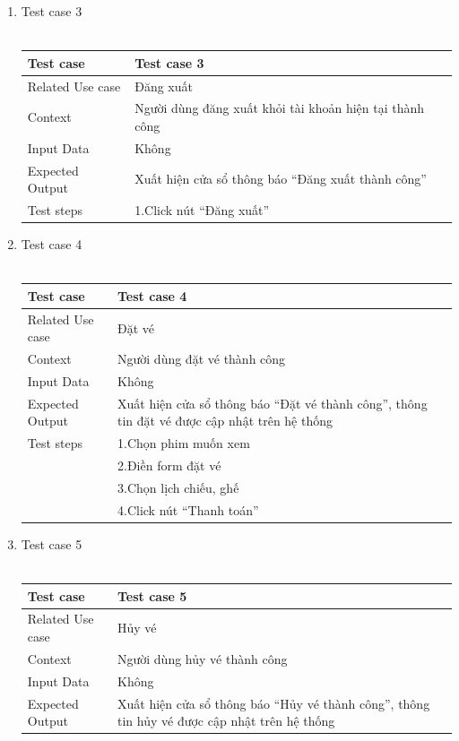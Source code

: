 \documentclass[a4paper, 12pt]{article}
\begin{document}
\begin{enumerate}
		\item Test case 3\\\\
		\begin{tabular}{|l|l|}
			\hline
			Test case&
			Test case 3\\
			\hline
			Related Use case&
			Đăng xuất\\
			\hline
			Context&
			Người dùng đăng xuất khỏi tài khoản hiện tại thành công\\
			\hline
			Input Data&
			Không\\
			\hline
			Expected Output&
			Xuất hiện cửa sổ thông báo “Đăng xuất thành công” \\
			\hline
			Test steps&
			1.Click nút “Đăng xuất”\\
			\hline
		\end{tabular}
		\item Test case 4\\\\
		\begin{tabular}{|l|l|}
			\hline
			Test case&
			Test case 4\\
			\hline
			Related Use case&
			Đặt vé\\
			\hline
			Context&
			Người dùng đặt vé thành công\\
			\hline
			Input Data&
			Không\\
			\hline
			Expected Output&
			Xuất hiện cửa sổ thông báo “Đặt vé thành công”, thông tin đặt vé được cập nhật trên hệ thống\\
			\hline
			Test steps&
			1.Chọn phim muốn xem\\&
			2.Điền form đặt vé\\&
			3.Chọn lịch chiếu, ghế \\&
			4.Click nút “Thanh toán”\\
			\hline
		\end{tabular}
		\item Test case 5\\\\
		\begin{tabular}{|l|l|}
			\hline
			Test case&
			Test case 5\\
			\hline
			Related Use case&
			Hủy vé\\
			\hline
			Context&
			Người dùng hủy vé thành công\\
			\hline
			Input Data&
			Không\\
			\hline
			Expected Output&
			Xuất hiện cửa sổ thông báo “Hủy vé thành công”, thông tin hủy vé được cập nhật trên hệ thống\\

\end{tabular}
\end{enumerate}
\end{document}
